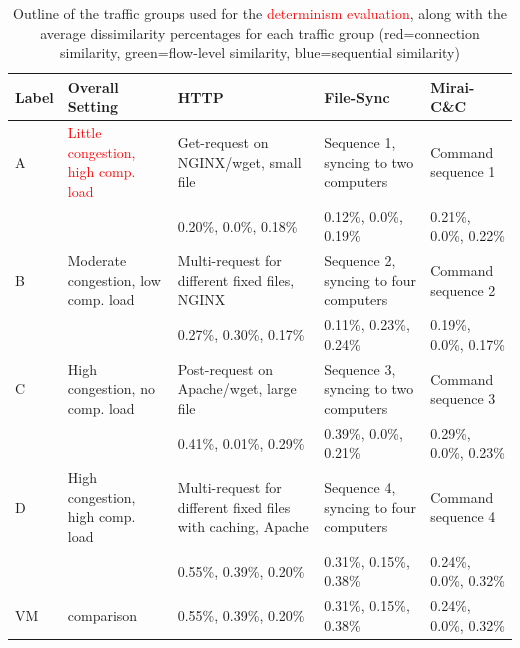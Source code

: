 \documentclass{article}
\begin{document}
\begin{table}
\centering
\begin{tabular}{p{0.8cm}|p{2.5cm}|p{2.7cm}|p{2.7cm}|p{2.7cm}}
Label &Overall Setting&HTTP&File-Sync & Mirai-C\&C\\ \hline
A&\textcolor{red}{Little congestion, high comp. load} & Get-request on NGINX/wget, small file & Sequence 1,  syncing to two computers & Command sequence 1 \\ \hline
 &&\footnotesize \textcolor{myred}{0.20\%}, \textcolor{mygreen}{0.0\%}, \textcolor{myblue}{0.18\%}&
 \footnotesize \textcolor{myred}{0.12\%}, \textcolor{mygreen}{0.0\%}, \textcolor{myblue}{0.19\%}&
 \footnotesize \textcolor{myred}{0.21\%}, \textcolor{mygreen}{0.0\%}, \textcolor{myblue}{0.22\%}\\ \hline \hline
B& Moderate congestion, low comp. load &Multi-request for different fixed files, NGINX & Sequence 2,  syncing to four computers & Command sequence 2\\ \hline
 &&\footnotesize \textcolor{myred}{0.27\%}, \textcolor{mygreen}{0.30\%}, \textcolor{myblue}{0.17\%}&
\footnotesize \textcolor{myred}{0.11\%}, \textcolor{mygreen}{0.23\%}, \textcolor{myblue}{0.24\%}&
\footnotesize \textcolor{myred}{0.19\%}, \textcolor{mygreen}{0.0\%}, \textcolor{myblue}{0.17\%}\\ \hline \hline
C& High congestion, no comp. load & Post-request on Apache/wget, large file &Sequence 3,  syncing to two computers & Command sequence 3\\ \hline
 &&\footnotesize \textcolor{myred}{0.41\%}, \textcolor{mygreen}{0.01\%}, \textcolor{myblue}{0.29\%}&
 \footnotesize \textcolor{myred}{0.39\%}, \textcolor{mygreen}{0.0\%}, \textcolor{myblue}{0.21\%}&
 \footnotesize \textcolor{myred}{0.29\%}, \textcolor{mygreen}{0.0\%}, \textcolor{myblue}{0.23\%}\\ \hline \hline
D& High congestion, high comp. load & Multi-request for different fixed files with caching, Apache & Sequence 4,  syncing to four computers & Command sequence 4\\ \hline
 &&\footnotesize \textcolor{myred}{0.55\%}, \textcolor{mygreen}{0.39\%}, \textcolor{myblue}{0.20\%}&
 \footnotesize \textcolor{myred}{0.31\%}, \textcolor{mygreen}{0.15\%}, \textcolor{myblue}{0.38\%}&
 \footnotesize \textcolor{myred}{0.24\%}, \textcolor{mygreen}{0.0\%}, \textcolor{myblue}{0.32\%}\\ \hline \hline
VM & comparison&\footnotesize \textcolor{myred}{0.55\%}, \textcolor{mygreen}{0.39\%}, \textcolor{myblue}{0.20\%}&
 \footnotesize \textcolor{myred}{0.31\%}, \textcolor{mygreen}{0.15\%}, \textcolor{myblue}{0.38\%}&
 \footnotesize \textcolor{myred}{0.24\%}, \textcolor{mygreen}{0.0\%}, \textcolor{myblue}{0.32\%}\\ \hline \hline
\end{tabular}
\caption{Outline of the traffic groups used for the \textcolor{red}{determinism evaluation}, along with the average dissimilarity percentages for each traffic group (red=connection similarity, green=flow-level similarity, blue=sequential similarity)}\label{Dataset}
\end{table}
\end{document}
